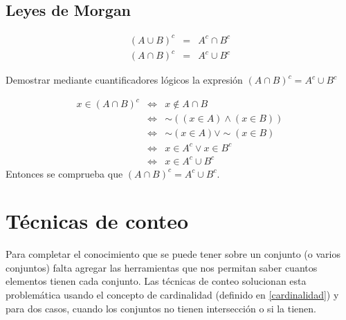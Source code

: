 \subsection{Leyes de Morgan}
\begin{eqnarray}
(A\cup B)^{c}&=& A^{c}\cap B^{c}\\
(A\cap B)^{c}&=& A^{c}\cup B^{c}
\end{eqnarray}
\begin{myexample}
Demostrar mediante cuantificadores lógicos la expresión $(A\cap B)^{c}=A^{c}\cup B^{c}$
\end{myexample}

\begin{eqnarray}
x\in (A\cap B)^{c} &\Leftrightarrow & x\notin A\cap B \nonumber\\
&\Leftrightarrow & \sim ((x\in A)\wedge(x\in B))\nonumber\\
&\Leftrightarrow &\sim (x\in A)\vee\sim(x\in B)\nonumber\\
&\Leftrightarrow & x\in A^{c} \vee x\in B^{c}\nonumber\\
&\Leftrightarrow & x\in A^{c}\cup B^{c}\nonumber
\end{eqnarray}
Entonces se comprueba que $(A\cap B)^{c}=A^{c}\cup B^{c}$.


\section{Técnicas de conteo}
Para completar el conocimiento que se puede tener sobre un conjunto (o varios conjuntos) falta agregar las herramientas que nos permitan saber cuantos elementos tienen cada conjunto. Las técnicas de conteo solucionan esta problemática usando el concepto de cardinalidad (definido en \ref{cardinalidad}) y para dos casos, cuando los conjuntos no tienen intersección o si la tienen.
